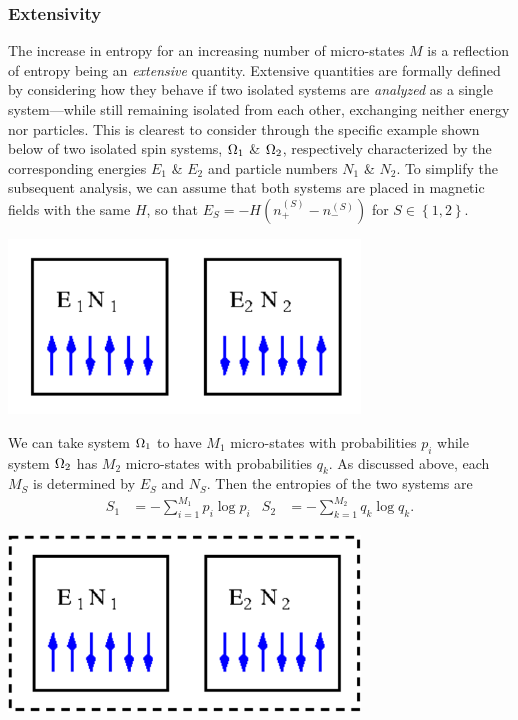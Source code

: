 \subsubsection{Extensivity}
The increase in entropy for an increasing number of micro-states $M$ is a reflection of entropy being an \textit{extensive} quantity.
Extensive quantities are formally defined by considering how they behave if two isolated systems are \textit{analyzed} as a single system---while still remaining isolated from each other, exchanging neither energy nor particles.
This is clearest to consider through the specific example shown below of two isolated spin systems, $\Omega_1$ \& $\Omega_2$, respectively characterized by the corresponding energies $E_1$ \& $E_2$ and particle numbers $N_1$ \& $N_2$.
To simplify the subsequent analysis, we can assume that both systems are placed in magnetic fields with the same $H$, so that $E_S = -H\left(n_+^{(S)} - n_-^{(S)}\right)$ for $S \in \left\{1, 2\right\}$.
\begin{center}
  \includegraphics[width=0.7\textwidth]{figs/unit02_entropy-separate.pdf}
\end{center}

We can take system $\Omega_1$ to have $M_1$ micro-states with probabilities $p_i$ while system $\Omega_2$ has $M_2$ micro-states with probabilities $q_k$.
As discussed above, each $M_S$ is determined by $E_S$ and $N_S$.
Then the entropies of the two systems are
\begin{align*}
  S_1 & = - \sum_{i = 1}^{M_1} p_i \log p_i &
  S_2 & = - \sum_{k = 1}^{M_2} q_k \log q_k.
\end{align*}

\begin{center}
  \includegraphics[width=0.7\textwidth]{figs/unit02_entropy-combo.pdf}
\end{center}

